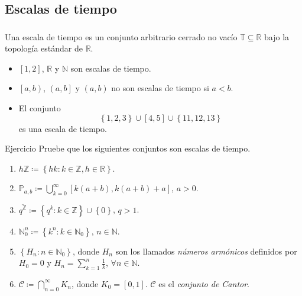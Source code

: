 \subsection{Escalas de tiempo}

\begin{frame}[t]
\frametitle{\subsecname}

\begin{definition}
Una escala de tiempo es un conjunto arbitrario cerrado no vacío $\mathds{T}\subseteq\mathds{R}$ bajo la topología estándar de $\mathds{R}$.
\end{definition}

\begin{example}
	\begin{itemize}
		\item $\left[1,2\right]$, $\mathds{R}$ y $\mathds{N}$ \alert{son escalas de tiempo}.
		\item $\left[a,b\right)$, $\left(a,b\right]$ y $\left(a,b\right)$ \alert{no son escalas de tiempo} si $a<b$.
		\item El conjunto \[ \left\{1,2,3\right\}\cup\left[4,5\right]\cup\left\{11,12,13\right\} \] \alert{es una escala de tiempo}.
	\end{itemize}
\end{example}

\begin{alertblock}{Ejercicio}
Pruebe que los siguientes conjuntos son escalas de tiempo.
	\begin{multicols}{2}
		\begin{enumerate}[topsep=0pt]
			\item $h\mathds{Z}\coloneqq\left\{hk:k\in\mathds{Z}, h\in\mathds{R}\right\}$.
			\item $\mathds{P}_{a,b}\coloneqq\bigcup_{k=0}^{\infty}\left[k\left(a+b\right),k\left(a+b\right)+a\right]$, $a>0$.
			\item $\overline{q^{\mathds{Z}}}\coloneqq\left\{q^{k}:k\in\mathds{Z}\right\}\cup\left\{0\right\}$, $q>1$.
			\item $\mathds{N}^{n}_{0}\coloneqq\left\{k^{n}:k\in\mathds{N}_{0}\right\}$, $n\in\mathds{N}$.
			\item $\left\{H_{n}:n\in\mathds{N}_{0}\right\}$, donde $H_{n}$ son los llamados \emph{números armónicos} definidos por $H_{0}=0$ y $H_{n}=\sum_{k=1}^{n}\frac{1}{k}$, $\forall n\in\mathds{N}$.
			\item $\mathcal{C}\coloneqq\bigcap_{n=0}^{\infty}K_{n}$, donde $K_{0}=\left[0,1\right]$. $\mathcal{C}$ es el \emph{conjunto de Cantor}.
		\end{enumerate}
	\end{multicols}
\end{alertblock}
\end{frame}

